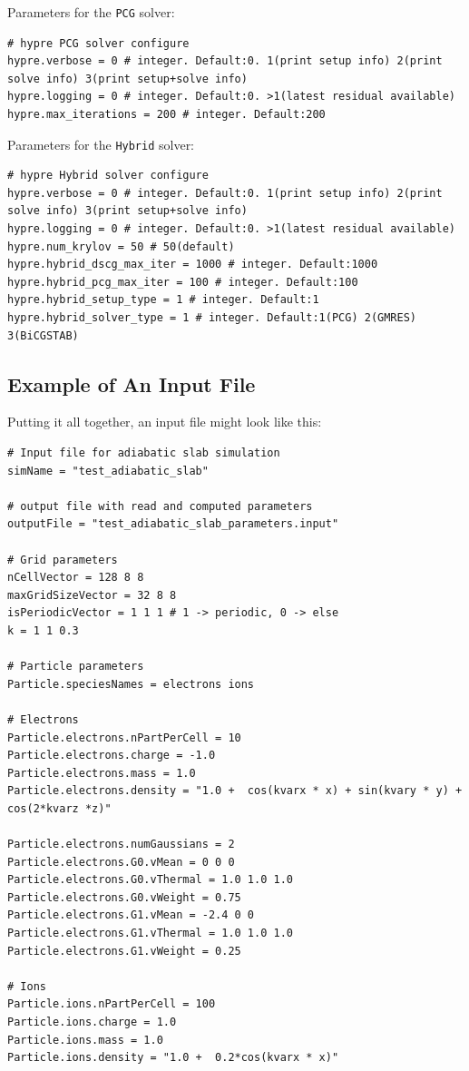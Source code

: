 \documentclass[11pt]{article}
\begin{document}
\begin{itemize}
Parameters for the \verb|PCG| solver:
\begin{lstlisting}[language=pkgconfig]
# hypre PCG solver configure
hypre.verbose = 0 # integer. Default:0. 1(print setup info) 2(print solve info) 3(print setup+solve info)
hypre.logging = 0 # integer. Default:0. >1(latest residual available)
hypre.max_iterations = 200 # integer. Default:200
\end{lstlisting}

Parameters for the \verb|Hybrid| solver:
\begin{lstlisting}[language=pkgconfig]
# hypre Hybrid solver configure
hypre.verbose = 0 # integer. Default:0. 1(print setup info) 2(print solve info) 3(print setup+solve info)
hypre.logging = 0 # integer. Default:0. >1(latest residual available)
hypre.num_krylov = 50 # 50(default)
hypre.hybrid_dscg_max_iter = 1000 # integer. Default:1000
hypre.hybrid_pcg_max_iter = 100 # integer. Default:100
hypre.hybrid_setup_type = 1 # integer. Default:1
hypre.hybrid_solver_type = 1 # integer. Default:1(PCG) 2(GMRES) 3(BiCGSTAB)
\end{lstlisting}

\subsection{Example of An Input File}
Putting it all together, an input file might look like this:
\begin{lstlisting}[language=pkgconfig]
# Input file for adiabatic slab simulation
simName = "test_adiabatic_slab"

# output file with read and computed parameters
outputFile = "test_adiabatic_slab_parameters.input"

# Grid parameters
nCellVector = 128 8 8
maxGridSizeVector = 32 8 8
isPeriodicVector = 1 1 1 # 1 -> periodic, 0 -> else
k = 1 1 0.3

# Particle parameters
Particle.speciesNames = electrons ions

# Electrons
Particle.electrons.nPartPerCell = 10
Particle.electrons.charge = -1.0
Particle.electrons.mass = 1.0
Particle.electrons.density = "1.0 +  cos(kvarx * x) + sin(kvary * y) + cos(2*kvarz *z)"

Particle.electrons.numGaussians = 2
Particle.electrons.G0.vMean = 0 0 0
Particle.electrons.G0.vThermal = 1.0 1.0 1.0
Particle.electrons.G0.vWeight = 0.75
Particle.electrons.G1.vMean = -2.4 0 0
Particle.electrons.G1.vThermal = 1.0 1.0 1.0
Particle.electrons.G1.vWeight = 0.25

# Ions
Particle.ions.nPartPerCell = 100 
Particle.ions.charge = 1.0
Particle.ions.mass = 1.0
Particle.ions.density = "1.0 +  0.2*cos(kvarx * x)"


\end{lstlisting}
\end{itemize}
\end{document}

